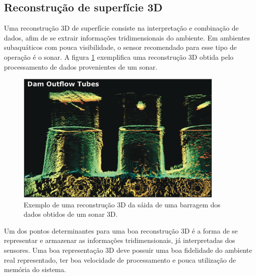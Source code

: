 
\subsection{Reconstrução de superfície 3D}

Uma reconstrução 3D de superfície consiste na interpretação e combinação de
dados, afim de se extrair informações tridimensionais do ambiente. Em ambientes
subaquáticos com pouca visibilidade, o sensor recomendado para esse tipo de
operação é o sonar. A figura \ref{figs/3d/3dcomporta} exemplifica uma
reconstrução 3D obtida pelo processamento de dados provenientes de um sonar.
\begin{figure}[H]
    \centering \includegraphics[width=0.9\textwidth]{figs/3d/3dcomporta}
    \caption{Exemplo de uma reconstrução 3D da sáida de uma barragem dos dados obtidos de um sonar 3D.}
    \label{figs/3d/3dcomporta}
\end{figure}


Um dos pontos determinantes para uma boa reconstrução 3D é a forma de se representar e armazenar as informações tridimensionais, já interpretadas dos sensores. Uma boa representação 3D deve possuir uma boa fidelidade do ambiente real representado, ter boa velocidade de processamento e pouca utilização de memória do sistema.

